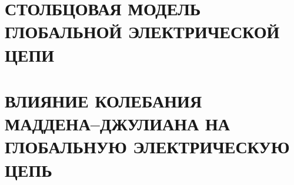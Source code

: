 \documentclass[12pt, russian, a4paper]{article}
\begin{document}
    
    \setcounter{page}{2}

    \tableofcontents
    
    \newpage
    

    \section{СТОЛБЦОВАЯ МОДЕЛЬ ГЛОБАЛЬНОЙ ЭЛЕКТРИЧЕСКОЙ ЦЕПИ}
    \section{ВЛИЯНИЕ КОЛЕБАНИЯ МАДДЕНА--ДЖУЛИАНА НА ГЛОБАЛЬНУЮ ЭЛЕКТРИЧЕСКУЮ ЦЕПЬ}
    
    
    
    
    
    
    


    \newpage
    
    
\end{document}
